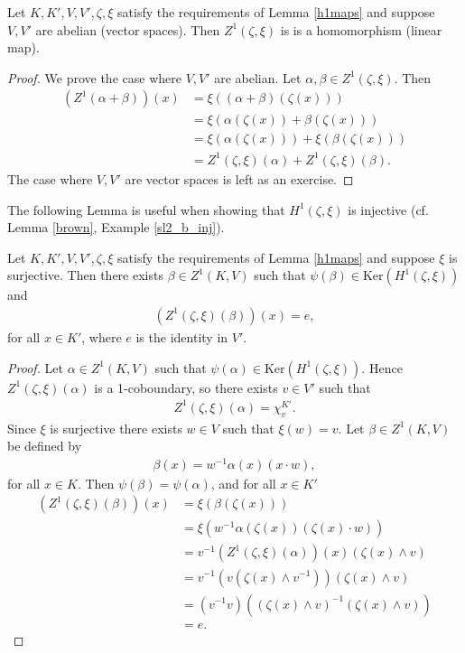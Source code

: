 \begin{corollary} \label{zlinear} Let $K,K',V,V',\zeta,\xi$ satisfy the requirements of Lemma \ref{h1maps} and suppose $V,V'$ are abelian (vector spaces). Then $Z^1(\zeta, \xi)$ is is a homomorphism (linear map).
\end{corollary}
\begin{proof}
	We prove the case where $V, V'$ are abelian. Let $\alpha, \beta \in Z^1(\zeta, \xi)$. Then
\begin{align*}
	\left(Z^1(\alpha + \beta)\right)(x) &= \xi\left((\alpha + \beta)(\zeta(x))\right) \\
		&= \xi\left(\alpha(\zeta(x)) + \beta(\zeta(x))\right) \\
		&= \xi\left(\alpha(\zeta(x))\right) + \xi\left(\beta(\zeta(x))\right) \\
		&= Z^1(\zeta, \xi)(\alpha) + Z^1(\zeta, \xi)(\beta).
\end{align*}
The case where $V, V'$ are vector spaces is left as an exercise.
\end{proof}

The following Lemma is useful when showing that $H^1(\zeta, \xi)$ is injective (cf. Lemma \ref{brown}, Example \ref{sl2_b_inj}).

\begin{lemma}\label{kerh1} Let $K, K', V, V', \zeta, \xi$ satisfy the requirements of Lemma \ref{h1maps} and suppose $\xi$ is surjective. 
Then there exists $\beta \in Z^1(K, V)$ such that $\psi(\beta) \in \mathrm{Ker}\left(H^1(\zeta, \xi)\right)$ and
\begin{align*}
	\left(Z^1(\zeta, \xi)(\beta)\right)(x) = e,
\end{align*}
for all $x \in K'$, where $e$ is the identity in $V'$.
\end{lemma}
\begin{proof}
	Let $\alpha \in Z^1(K, V)$ such that $\psi(\alpha) \in \mathrm{Ker}\left(H^1(\zeta, \xi)\right)$. Hence $Z^1(\zeta, \xi)(\alpha)$ is a 1-coboundary, so there exists $v \in V'$ such that
\begin{align*}
	Z^1(\zeta, \xi)(\alpha) = \chi^{K'}_v.
\end{align*}
Since $\xi$ is surjective there exists $w \in V$ such that $\xi(w) = v$.
Let $\beta \in Z^1(K, V)$ be defined by
\begin{align*}
	\beta(x) = w^{-1}\alpha(x)(x \cdot w),
\end{align*}
for all $x \in K$. Then $\psi(\beta) = \psi(\alpha)$, and for all $x \in K'$
\begin{align*}
	\left(Z^1(\zeta, \xi)(\beta)\right)(x) &= \xi\left(\beta(\zeta(x))\right) \\
		&= \xi\left(w^{-1}\alpha(\zeta(x))(\zeta(x)\cdot w )\right) \\
		&= v^{-1} \left(Z^1(\zeta, \xi)(\alpha)\right)(x) (\zeta(x) \wedge v ) \\
		&= v^{-1} \left(v(\zeta(x) \wedge v^{-1})\right) (\zeta(x) \wedge v ) \\
		&= (v^{-1} v) \left((\zeta(x) \wedge v)^{-1} (\zeta(x) \wedge v )\right) \\
		&= e.
\end{align*}
\end{proof}

